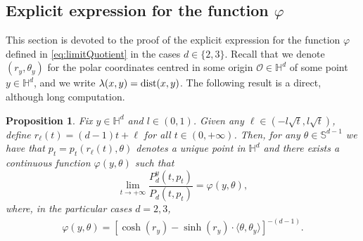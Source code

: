 \documentclass[12pt,longbibliography]{article}
\def\H{\mathbb{H}}
\newtheorem{prp}[thm]{Proposition}
\theoremstyle{definition}
\theoremstyle{remark}
\theoremstyle{example}
\newcommand{\ag}[1]{{\color{magenta} #1}}
\begin{document}
\subsection{Explicit expression for the function $\varphi$}\label{sect:ExplicitVarPhi}
This section is devoted to the proof of the explicit expression for the function $\varphi$ defined in \eqref{eq:limitQuotient} in the cases $d\in\{2,3\}$. Recall that we denote $(r_y,\theta_y)$ for the polar coordinates centred in some origin $\mathcal{O} \in \mathbb{H}^d$ of some point $y \in \mathbb{H}^d$, and we write $\lambda (x,y) = \textup{dist}(x,y)$. The following result is a direct, although long computation.
\begin{prp}\label{propVarPhi}
	Fix $y\in\H^d$ and $l\in(0,1)$. Given any $\ell \in (-l  \sqrt{t}, l \sqrt{t})$, define $r_{\ell} (t) = (d-1)t+ \ell$ for all $t \in (0,+\infty)$. Then, for any $\theta \in \mathbb{S}^{d-1}$ we have that $p_t=p_t(r_\ell(t), \theta)$ denotes a unique point in $\H^d$ and	there exists a continuous function $\varphi (y,\theta)$ such that
	\begin{equation*}
		\displaystyle\lim_{t \to +\infty} \frac{P_d^y (t,p_t)}{ P_d (t,p_t)} = \varphi (y,\theta),
	\end{equation*}
	where, in the particular cases $d=2, 3$,
	\begin{equation*}
		\begin{aligned}
			\varphi (y,\theta) =\left[ \cosh (r_y)-\sinh (r_y) \cdot \langle\theta,\theta_y\rangle \right]^{-(d-1)}.
		\end{aligned}
	\end{equation*}
\end{prp}
\end{document}
